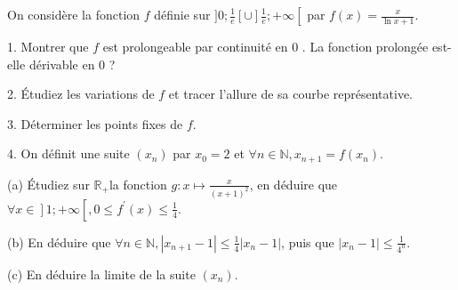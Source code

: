 \documentclass[a4paper, 11pt,reqno]{article}
\begin{document}
\begin{exercice}

On considère la fonction $f$ définie sur $] 0 ; \frac{1}{e}[\cup] \frac{1}{e} ;+\infty\left[\right.$ par $f(x)=\frac{x}{\ln x+1}$.

1. Montrer que $f$ est prolongeable par continuité en 0 . La fonction prolongée est-elle dérivable en 0 ?

2. Étudiez les variations de $f$ et tracer l'allure de sa courbe représentative.

3. Déterminer les points fixes de $f$.

4. On définit une suite $\left(x_{n}\right)$ par $x_{0}=2$ et $\forall n \in \mathbb{N}, x_{n+1}=f\left(x_{n}\right)$.

(a) Étudiez sur $\mathbb{R}_{+}$la fonction $g: x \mapsto \frac{x}{(x+1)^{2}}$, en déduire que $\left.\forall x \in\right] 1 ;+\infty\left[, 0 \leq f^{\prime}(x) \leq \frac{1}{4}\right.$.

(b) En déduire que $\forall n \in \mathbb{N},\left|x_{n+1}-1\right| \leq \frac{1}{4}\left|x_{n}-1\right|$, puis que $\left|x_{n}-1\right| \leq \frac{1}{4^{n}}$.

(c) En déduire la limite de la suite $\left(x_{n}\right)$.
\end{exercice}
\end{document}
